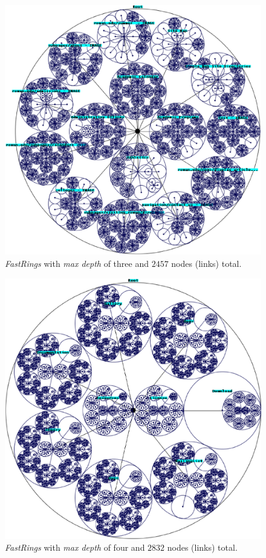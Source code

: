 \documentclass[]{article}
\begin{document}
{\begin{figure}[t]
\centering
\includegraphics[width=6.25in]{images/webgps_3levels}
\caption{{\em FastRings} with {\em max depth} of three and $2457$ nodes (links) total.}
\label{fig_3levels}
\end{figure}

\begin{figure}[t]
\centering
\includegraphics[width=6.25in]{images/webgps_4levelsPS}
\caption{{\em FastRings} with {\em max depth} of four and $2832$ nodes (links) total.}
\label{fig_4levels}
\end{figure}

}
\end{document}
